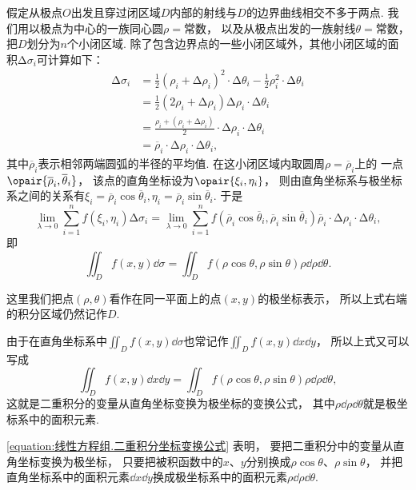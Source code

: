 假定从极点\(O\)出发且穿过闭区域\(D\)内部的射线与\(D\)的边界曲线相交不多于两点.
我们用以极点为中心的一族同心圆\(\rho = \text{常数}\)，
以及从极点出发的一族射线\(\theta = \text{常数}\)，
把\(D\)划分为\(n\)个小闭区域.
除了包含边界点的一些小闭区域外，其他小闭区域的面积\(\increment\sigma_i\)可计算如下：
\begin{align*}
	\increment\sigma_i
	&= \frac{1}{2} (\rho_i+\increment\rho_i)^2 \cdot \increment\theta_i
	- \frac{1}{2} \rho_i^2 \cdot \increment\theta_i \\
	&= \frac{1}{2} (2\rho_i + \increment\rho_i) \increment\rho_i \cdot \increment\theta_i \\
	&= \frac{\rho_i + (\rho_i+\increment\rho_i)}{2}
		\cdot \increment\rho_i \cdot \increment\theta_i \\
	&= \overline{\rho}_i \cdot \increment\rho_i \cdot \increment\theta_i,
\end{align*}
其中\(\overline{\rho}_i\)表示相邻两端圆弧的半径的平均值.
在这小闭区域内取圆周\(\rho = \overline{\rho}_i\)上的
一点\(\opair{\overline{\rho}_i,\overline{\theta}_i}\)，
该点的直角坐标设为\(\opair{\xi_i,\eta_i}\)，
则由直角坐标系与极坐标系之间的关系有\(\xi_i = \overline{\rho}_i \cos\overline{\theta}_i,
\eta_i = \overline{\rho}_i \sin\overline{\theta}_i\).
于是\begin{equation*}
	\lim_{\lambda\to0} \sum_{i=1}^n f(\xi_i,\eta_i) \increment\sigma_i
	= \lim_{\lambda\to0} \sum_{i=1}^n
	f(\overline{\rho}_i \cos\overline{\theta}_i,\overline{\rho}_i \sin\overline{\theta}_i)
	\overline{\rho}_i \cdot \increment\rho_i \cdot \increment\theta_i,
\end{equation*}
即\begin{equation*}
	\iint_D f(x,y) \dd{\sigma}
	= \iint_D f(\rho\cos\theta,\rho\sin\theta) \rho \dd{\rho} \dd{\theta}.
\end{equation*}

这里我们把点\((\rho,\theta)\)看作在同一平面上的点\((x,y)\)的极坐标表示，
所以上式右端的积分区域仍然记作\(D\).

由于在直角坐标系中\(\iint_D f(x,y) \dd{\sigma}\)也常记作\(\iint_D f(x,y) \dd{x} \dd{y}\)，
所以上式又可以写成
\begin{equation}\label{equation:线性方程组.二重积分坐标变换公式}
\iint_D f(x,y) \dd{x} \dd{y}
= \iint_D f(\rho\cos\theta,\rho\sin\theta) \rho \dd{\rho} \dd{\theta},
\end{equation}
这就是二重积分的变量从直角坐标变换为极坐标的变换公式，
其中\(\rho \dd{\rho} \dd{\theta}\)就是极坐标系中的面积元素.

\cref{equation:线性方程组.二重积分坐标变换公式} 表明，
要把二重积分中的变量从直角坐标变换为极坐标，
只要把被积函数中的\(x\)、\(y\)分别换成\(\rho \cos\theta\)、\(\rho \sin\theta\)，
并把直角坐标系中的面积元素\(\dd{x} \dd{y}\)换成极坐标系中的面积元素\(\rho \dd{\rho} \dd{\theta}\).

